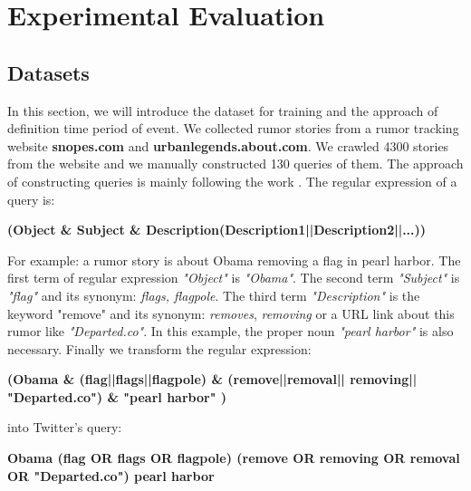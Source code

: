 \section{Experimental Evaluation} %
  \subsection{Datasets} 
  \label{sec:dataset_single}
In this section, we will introduce the dataset for training and the approach of definition time period of event. We collected rumor stories from a rumor tracking website \textbf{snopes.com} and \textbf{urbanlegends.about.com}. We crawled 4300 stories from the website and we manually constructed 130 queries of them. The approach of constructing queries is mainly following the work \cite{gupta2014tweetcred}. The regular expression of a query is:

 \textbf{ (Object \& Subject \& Description(Description1||Description2||...)) }


For example: a rumor story is about Obama removing a flag in pearl harbor. The first term of regular expression  \emph{"Object"} is  \emph{"Obama"}. The second term  \emph{"Subject"} is  \emph{"flag"} and its synonym:  \emph{flags, flagpole}. The third term  \emph{"Description"} is the keyword "remove" and its synonym:  \emph{removes},  \emph{removing} or a URL link about this rumor like  \emph{"Departed.co"}. In this example, the proper noun \emph{"pearl harbor"} is also necessary. Finally we transform the regular expression:
 
 \textbf{ (Obama \& (flag||flags||flagpole) \& (remove||removal|| removing|| "Departed.co") \& "pearl harbor" ) }
 
into Twitter's query: 

\textbf{Obama (flag OR flags OR flagpole) (remove OR removing OR removal OR "Departed.co") pearl harbor}


